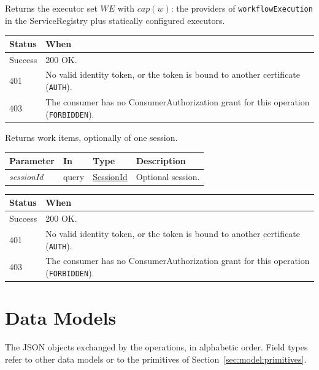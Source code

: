 \documentclass[a4paper]{arrowhead}
\newcommand{\fparam}[1]{\textit{\textcolor{ArrowheadBlue}{#1}}}
\newcommand{\pref}[1]{{\textcolor{ArrowheadGrey}{\hyperref[sec:model:primitives:#1]{#1}}}}
\begin{document}
Returns the executor set $WE$ with $cap(w)$: the providers of \texttt{workflow\allowbreak{}Execution} in the ServiceRegistry plus statically configured executors.

{\small
\begin{longtable}{|p{2.0cm}|p{13.8cm}|}

\hline
\rowcolor{gray!33} Status & When \\ \hline
\endhead
Success & 200 OK. \\ \hline
401 & No valid identity token, or the token is bound to another certificate (\texttt{AUTH}). \\ \hline
403 & The consumer has no ConsumerAuthorization grant for this operation (\texttt{FORBIDDEN}). \\ \hline
\end{longtable}
}

Returns work items, optionally of one session.

{\small
\begin{longtable}{|p{3.0cm}|p{1.4cm}|p{3.2cm}|p{8.2cm}|}

\hline
\rowcolor{gray!33} Parameter & In & Type & Description \\ \hline
\endhead
\fparam{sessionId} & query & \pref{SessionId} & Optional session. \\ \hline
\end{longtable}
}


{\small
\begin{longtable}{|p{2.0cm}|p{13.8cm}|}

\hline
\rowcolor{gray!33} Status & When \\ \hline
\endhead
Success & 200 OK. \\ \hline
401 & No valid identity token, or the token is bound to another certificate (\texttt{AUTH}). \\ \hline
403 & The consumer has no ConsumerAuthorization grant for this operation (\texttt{FORBIDDEN}). \\ \hline
\end{longtable}
}


\newpage
\section{Data Models}
\label{sec:model}
The JSON objects exchanged by the operations, in alphabetic order. Field types refer to other data models or to the
primitives of Section~\ref{sec:model:primitives}.
\end{document}
